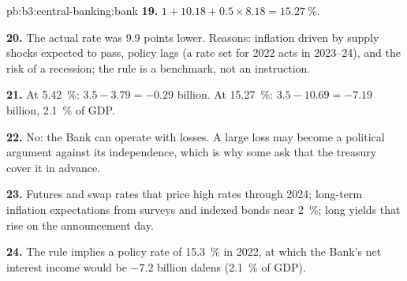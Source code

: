 \begin{solution}{pb:b3:central-banking:bank}
\textbf{19.} $1 + 10.18 + 0.5 \times 8.18 = 15.27~\%$.

\textbf{20.} The actual rate was 9.9 points lower. Reasons: inflation driven by
supply shocks expected to pass, policy lags (a rate set for 2022 acts in 2023--24),
and the risk of a recession; the rule is a benchmark, not an instruction.

\textbf{21.} At 5.42~\%: $3.5 - 3.79 = -0.29$ billion. At 15.27~\%: $3.5 - 10.69 = -7.19$ billion, 2.1~\%
of GDP.

\textbf{22.} No: the Bank can operate with losses. A large loss may become a political
argument against its independence, which is why some ask that the treasury cover
it in advance.

\textbf{23.} Futures and swap rates that price high rates through 2024; long-term
inflation expectations from surveys and indexed bonds near 2~\%; long yields that
rise on the announcement day.

\textbf{24.} The rule implies a policy rate of 15.3~\% in 2022, at which the Bank's net
interest income would be $-7.2$ billion dalens (2.1~\% of GDP).
\end{solution}
